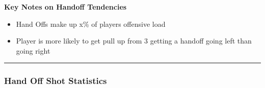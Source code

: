 \documentclass[a4paper,12pt]{article}
\begin{document}
\vspace{1.25em} %
\textbf{Key Notes on Handoff Tendencies}
\vspace{0.5em} %

\begin{itemize}
    \item Hand Offs make up x\% of players offensive load
    \vspace{0.3em} %
    \item Player is more likely to get pull up from 3 getting a handoff going left than going right
\end{itemize}

\vspace{1em} %
\hrule height 1pt width 1\textwidth %
\vspace{0em} %

\subsubsection{Hand Off Shot Statistics}
\end{document}
